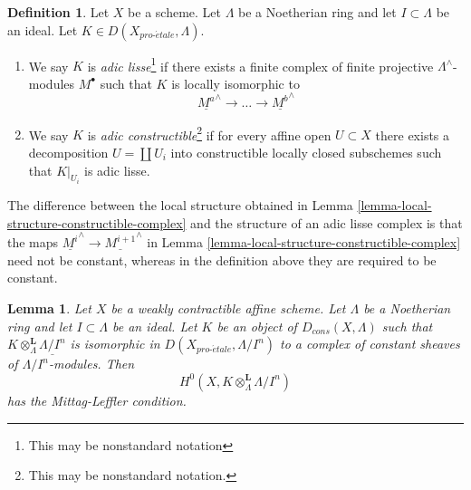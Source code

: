 \documentclass[10pt,a4paper]{article}
\theoremstyle{plain}
\newtheorem{lemma}[subsection]{Lemma}
\theoremstyle{definition}
\newtheorem{definition}[subsection]{Definition}
\theoremstyle{remark}
\numberwithin{equation}{subsection}
\def\proetale{{pro\text{-}\acute{e}tale}}
\begin{document}
\begin{definition}
\label{definition-adic-constructible}
Let $X$ be a scheme. Let $\Lambda$ be a Noetherian ring and let
$I \subset \Lambda$ be an ideal. Let $K \in D(X_\proetale, \Lambda)$.
\begin{enumerate}
\item We say $K$ is {\it adic lisse}\footnote{This may be
nonstandard notation} if there exists a finite complex of finite
projective $\Lambda^\wedge$-modules $M^\bullet$ such that
$K$ is locally isomorphic to
$$
\underline{M^a}^\wedge \to \ldots \to \underline{M^b}^\wedge
$$
\item We say $K$ is {\it adic constructible}\footnote{This may be
nonstandard notation.} if for every affine open $U \subset X$
there exists a decomposition $U = \coprod U_i$ into
constructible locally closed subschemes such that $K|_{U_i}$
is adic lisse.
\end{enumerate}
\end{definition}

\noindent
The difference between the local structure obtained in
Lemma \ref{lemma-local-structure-constructible-complex}
and the structure of an adic lisse complex is that
the maps $\underline{M^i}^\wedge \to \underline{M^{i + 1}}^\wedge$ in 
Lemma \ref{lemma-local-structure-constructible-complex}
need not be constant, whereas in the definition above they
are required to be constant.

\begin{lemma}
\label{lemma-weakly-contractible-locally-constant-ML}
Let $X$ be a weakly contractible affine scheme. Let $\Lambda$ be a Noetherian
ring and let $I \subset \Lambda$ be an ideal. Let $K$ be an object of
$D_{cons}(X, \Lambda)$ such that
$K \otimes_\Lambda^\mathbf{L} \underline{\Lambda/I^n}$
is isomorphic in $D(X_\proetale, \Lambda/I^n)$ to a
complex of constant sheaves of $\Lambda/I^n$-modules. Then
$$
H^0(X, K \otimes_\Lambda^\mathbf{L} \Lambda/I^n)
$$
has the Mittag-Leffler condition.
\end{lemma}
\end{document}
